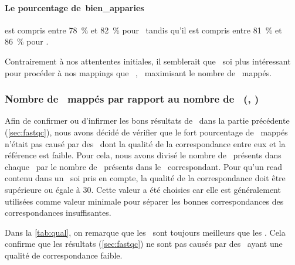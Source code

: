 \documentclass[../main]{subfiles} %
\begin{document}
\paragraph{Le pourcentage de \reads\,\gls{bien_apparies}} est compris entre 78 \% et 82 \% pour \TrMo tandis qu'il est compris entre 81 \% et 86 \% pour \TrEx.

Contrairement à nos attententes initiales, il semblerait que \TrEx soi plus intéressant pour procéder à nos \glspl{mapping} que \TrMo , \TrEx maximisant le nombre de \reads mappés.



\subsubsection{Nombre de \reads mappés par rapport au nombre de \contigs (\BamTrEx, \BamTrMo)}
Afin de confirmer ou d'infirmer les bons résultats de \TrEx dans la partie précédente (\cref{sec:fastqc}), nous avons décidé de vérifier que le fort pourcentage de \reads mappés n'était pas causé par des \reads dont la qualité de la correspondance entre eux et la référence est faible. Pour cela, nous avons divisé le nombre de \reads présents dans chaque \bam par le nombre de \reads présents dans le \fastq correspondant. Pour qu'un \gls{read} contenu dans un \bam soi pris en compte, la qualité de la correspondance doit être supérieure ou égale à 30. Cette valeur a été choisies car elle est généralement utilisées comme valeur minimale pour séparer les bonnes correspondances des correspondances insuffisantes.






Dans la \cref{tab:qual}, on remarque que les \BamTrEx sont toujours meilleurs que les \BamTrMo. Cela confirme que les résultats  (\cref{sec:fastqc}) ne sont pas causés par des \reads ayant une qualité de correspondance  faible.
\end{document}

